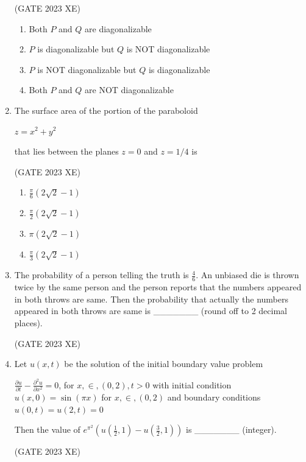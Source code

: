 \documentclass[journal,12pt,onecolumn]{IEEEtran}
\begin{document}
\begin{enumerate}
\hfill{(GATE 2023 XE)}

\begin{multicols}{2}

\begin{enumerate}

\item Both $P$ and $Q$ are diagonalizable

\item $P$ is diagonalizable but $Q$ is NOT diagonalizable

\item $P$ is NOT diagonalizable but $Q$ is diagonalizable

\item Both $P$ and $Q$ are NOT diagonalizable

\end{enumerate}

\end{multicols}

\item The surface area of the portion of the paraboloid

$z = x^2 + y^2$

that lies between the planes $z=0$ and $z=1/4$ is

\hfill{(GATE 2023 XE)}

\begin{multicols}{2}

\begin{enumerate}

\item $\frac{\pi}{6} (2\sqrt{2} -1)$

\item $\frac{\pi}{2} (2\sqrt{2} -1)$

\item $\pi (2\sqrt{2} -1)$

\item $\frac{\pi}{3} (2\sqrt{2} -1)$

\end{enumerate}

\end{multicols}

\item The probability of a person telling the truth is $\frac{4}{6}$. An unbiased die is thrown twice by
the same person and the person reports that the numbers appeared in both
throws are same. Then the probability that actually the numbers appeared in
both throws are same is \_\_\_\_\_\_\_ (round off to 2 decimal places).

\hfill{(GATE 2023 XE)}

\item Let $u(x,t)$ be the solution of the initial boundary value problem

$\frac{\partial u}{\partial t} - \frac{\partial^2 u}{\partial x^2} = 0$, for $x , \in , (0,2), t > 0$ with initial condition $u(x,0) = \sin (\pi x)$ for $x , \in , (0,2)$ and boundary conditions $u(0,t) = u(2,t) = 0$

Then the value of $e^{\pi^2} (u(\frac{1}{2},1) - u(\frac{3}{2},1))$ is \_\_\_\_\_\_\_ (integer).

\hfill{(GATE 2023 XE)}

\end{enumerate}
\end{document}
